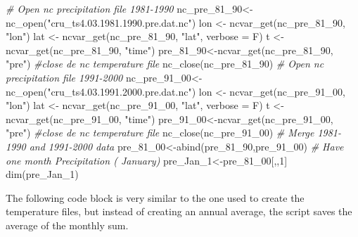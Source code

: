\documentclass[
  10pt,
  b5paper,
]{book}
\newenvironment{Shaded}{\begin{snugshade}}{\end{snugshade}}
\newcommand{\AttributeTok}[1]{\textcolor[rgb]{0.77,0.63,0.00}{#1}}
\newcommand{\CommentTok}[1]{\textcolor[rgb]{0.56,0.35,0.01}{\textit{#1}}}
\newcommand{\DecValTok}[1]{\textcolor[rgb]{0.00,0.00,0.81}{#1}}
\newcommand{\FunctionTok}[1]{\textcolor[rgb]{0.00,0.00,0.00}{#1}}
\newcommand{\NormalTok}[1]{#1}
\newcommand{\OtherTok}[1]{\textcolor[rgb]{0.56,0.35,0.01}{#1}}
\newcommand{\StringTok}[1]{\textcolor[rgb]{0.31,0.60,0.02}{#1}}
\begin{document}
\begin{Shaded}
\begin{Highlighting}[]
 \CommentTok{\# Open nc precipitation file 1981{-}1990}
\NormalTok{nc\_pre\_81\_90}\OtherTok{\textless{}{-}}\FunctionTok{nc\_open}\NormalTok{(}\StringTok{"cru\_ts4.03.1981.1990.pre.dat.nc"}\NormalTok{)}
\NormalTok{ lon }\OtherTok{\textless{}{-}} \FunctionTok{ncvar\_get}\NormalTok{(nc\_pre\_81\_90, }\StringTok{"lon"}\NormalTok{)}
\NormalTok{lat }\OtherTok{\textless{}{-}} \FunctionTok{ncvar\_get}\NormalTok{(nc\_pre\_81\_90, }\StringTok{"lat"}\NormalTok{, }\AttributeTok{verbose =}\NormalTok{ F)}
\NormalTok{t }\OtherTok{\textless{}{-}} \FunctionTok{ncvar\_get}\NormalTok{(nc\_pre\_81\_90, }\StringTok{"time"}\NormalTok{)}
\NormalTok{ pre\_81\_90}\OtherTok{\textless{}{-}}\FunctionTok{ncvar\_get}\NormalTok{(nc\_pre\_81\_90, }\StringTok{"pre"}\NormalTok{)}
 \CommentTok{\#close de nc temperature file}
 \FunctionTok{nc\_close}\NormalTok{(nc\_pre\_81\_90) }
\CommentTok{\# Open nc precipitation file 1991{-}2000}
\NormalTok{nc\_pre\_91\_00}\OtherTok{\textless{}{-}}\FunctionTok{nc\_open}\NormalTok{(}\StringTok{"cru\_ts4.03.1991.2000.pre.dat.nc"}\NormalTok{)}
\NormalTok{ lon }\OtherTok{\textless{}{-}} \FunctionTok{ncvar\_get}\NormalTok{(nc\_pre\_91\_00, }\StringTok{"lon"}\NormalTok{)}
\NormalTok{lat }\OtherTok{\textless{}{-}} \FunctionTok{ncvar\_get}\NormalTok{(nc\_pre\_91\_00, }\StringTok{"lat"}\NormalTok{, }\AttributeTok{verbose =}\NormalTok{ F)}
\NormalTok{t }\OtherTok{\textless{}{-}} \FunctionTok{ncvar\_get}\NormalTok{(nc\_pre\_91\_00, }\StringTok{"time"}\NormalTok{)}
\NormalTok{ pre\_91\_00}\OtherTok{\textless{}{-}}\FunctionTok{ncvar\_get}\NormalTok{(nc\_pre\_91\_00, }\StringTok{"pre"}\NormalTok{)}
 \CommentTok{\#close de nc temperature file}
 \FunctionTok{nc\_close}\NormalTok{(nc\_pre\_91\_00) }
 \CommentTok{\# Merge 1981{-}1990 and 1991{-}2000 data }
\NormalTok{ pre\_81\_00}\OtherTok{\textless{}{-}}\FunctionTok{abind}\NormalTok{(pre\_81\_90,pre\_91\_00)}
\CommentTok{\# Have one month Precipitation ( January)}
\NormalTok{ pre\_Jan\_1}\OtherTok{\textless{}{-}}\NormalTok{pre\_81\_00[,,}\DecValTok{1}\NormalTok{]}
 \FunctionTok{dim}\NormalTok{(pre\_Jan\_1)}
\end{Highlighting}
\end{Shaded}

The following code block is very similar to the one used to create the temperature files, but instead of creating an annual average, the script saves the average of the monthly sum.
\end{document}
